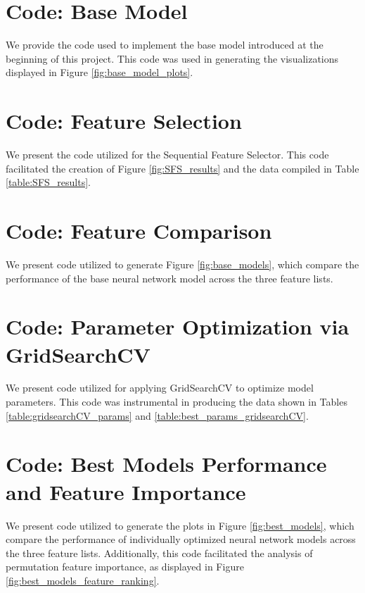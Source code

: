 \documentclass[]{article}
\begin{document}
\clearpage




\clearpage
\appendix

\clearpage
\section{Code: Base Model}\label{code_base}

We provide the code used to implement the base model introduced at the beginning of this project. This code was used in generating the visualizations displayed in Figure \ref{fig:base_model_plots}.



\section{Code: Feature Selection}\label{code_feat_selection}


We present the code utilized for the Sequential Feature Selector. This code facilitated the creation of Figure \ref{fig:SFS_results} and the data compiled in Table \ref{table:SFS_results}.



\section{Code: Feature Comparison}\label{code_feat_comparison}


We present code utilized to generate Figure \ref{fig:base_models}, which compare the performance of the base neural network model across the three feature lists.



\section{Code: Parameter Optimization via GridSearchCV}\label{code_model_selection}

We present code utilized for applying GridSearchCV to optimize model parameters. This code was instrumental in producing the data shown in Tables \ref{table:gridsearchCV_params} and \ref{table:best_params_gridsearchCV}.



\section{Code: Best Models Performance and Feature Importance}\label{code_best_models}

We present code utilized to generate the plots in Figure \ref{fig:best_models}, which compare the performance of individually optimized neural network models across the three feature lists. Additionally, this code facilitated the analysis of permutation feature importance, as displayed in Figure \ref{fig:best_models_feature_ranking}.


\end{document}
